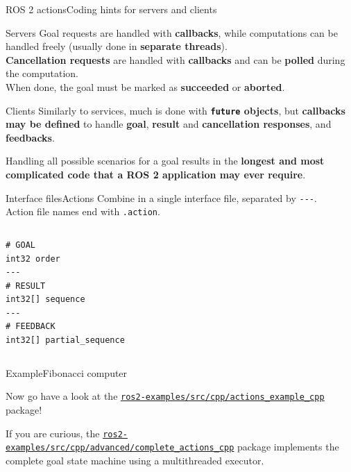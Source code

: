 \begin{frame}{ROS 2 actions}{Coding hints for servers and clients}
  \begin{block}{Servers}
    Goal requests are handled with \textbf{callbacks}, while computations can be handled freely (usually done in \textbf{separate threads}).\\
    \textbf{Cancellation requests} are handled with \textbf{callbacks} and can be \textbf{polled} during the computation.\\
    When done, the goal must be marked as \textbf{succeeded} or \textbf{aborted}.
  \end{block}
  \begin{block}{Clients}
    Similarly to services, much is done with \textbf{\texttt{future} objects}, but \textbf{callbacks may be defined} to handle \textbf{goal}, \textbf{result} and \textbf{cancellation responses}, and \textbf{feedbacks}.
  \end{block}
  \begin{block}{}
    \centering
    Handling all possible scenarios for a goal results in the \textbf{longest and most complicated code that a ROS 2 application may ever require}. {\Large\smiley{}}
  \end{block}
\end{frame}

\begin{frame}[fragile]{Interface files}{Actions}
  Combine  in a single interface file, separated by \texttt{-{}-{}-}.\\
  Action file names end with \texttt{.action}.
  \begin{columns}
  \begin{lstlisting}[language=ros2msg, caption=Definition of the \texttt{ros2\_examples\_interfaces/action/Fibonacci} action.]
# GOAL
int32 order
---
# RESULT
int32[] sequence
---
# FEEDBACK
int32[] partial_sequence\end{lstlisting}
  \end{columns}
\end{frame}

\begin{frame}{Example}{Fibonacci computer}
  \begin{block}{}
    \centering
    Now go have a look at the \href{https://github.com/IntelligentSystemsLabUTV/ros2-examples/tree/humble/src/cpp/actions_example_cpp}{\color{blue}\underline{\texttt{ros2-examples/src/cpp/actions\_example\_cpp}}} package!
  \end{block}
  If you are curious, the \href{https://github.com/IntelligentSystemsLabUTV/ros2-examples/tree/humble/src/cpp/advanced/complete_actions_cpp}{\color{blue}\underline{\texttt{ros2-examples/src/cpp/advanced/complete\_actions\_cpp}}} package implements the complete goal state machine using a multithreaded executor.
\end{frame}
